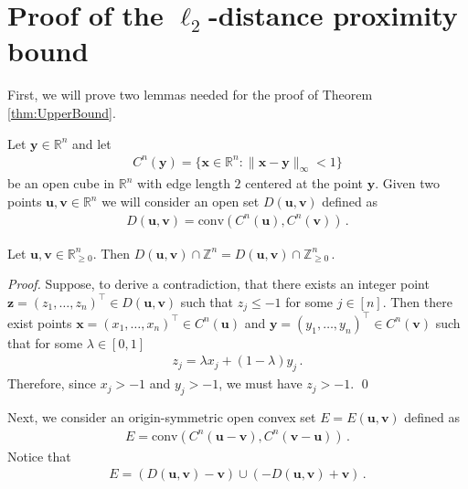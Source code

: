 \documentclass[runningheads]{llncs}
\newcommand{\ve}{\boldsymbol}
\newcommand{\be}{\begin{eqnarray}}
\newcommand{\bea}{\begin{eqnarray*}}
\newcommand{\ee}{\end{eqnarray}}
\newcommand{\eea}{\end{eqnarray*}}
\newcommand{\conv}{\mathrm{conv}}
\newcommand{\R}{\mathbb R}
\newcommand{\Z}{\mathbb Z}
\newcommand{\interior}{\mbox{\rm int}}
\renewcommand\>{\rangle}
\newcommand\<{\langle}
\newcommand\0{\mathbf{0}}
\begin{document}
\section{Proof of the $\ell_2$-distance proximity bound}

First, we will prove two lemmas needed for the proof of Theorem \ref{thm:UpperBound}.

Let ${\ve y} \in\R^n$ and let
\bea
C^n({\ve y})=\{{\ve x}\in  \R^n: \|{\ve x}-{\ve y} \|_{\infty} < 1 \}
\eea
be an open cube in $\R^n$ with edge length $2$ centered at the point ${\ve y}$. 
Given two points ${\ve u}, {\ve v}\in \R^n$ we will
consider an open set $D({\ve u}, {\ve v})$ defined as
%
\bea
D({\ve u}, {\ve v})=\conv(C^n({\ve u}), C^n({\ve v}))\,.
\eea

\begin{lemma}
\label{D_property} Let ${\ve u}, {\ve v}\in\R^n_{\ge 0}$. Then
$D({\ve u}, {\ve v})\cap\Z^n=D({\ve u}, {\ve v})\cap\Z^n_{\ge 0}\,.$
\end{lemma}
\begin{proof}
Suppose, to derive a contradiction, that there exists an integer point ${\ve z}=(z_1,\ldots, z_n)^\top \in D({\ve u}, {\ve v})$ such that $z_j\le -1$ for some $j\in [n]$.
Then there exist points ${\ve x}=(x_1,\ldots, x_n)^\top\in C^n({\ve u})$ and  ${\ve y}=(y_1,\ldots, y_n)^\top\in  C^n({\ve v})$ such that for some $\lambda\in [0,1]$ 
\bea
z_j=\lambda x_j + (1-\lambda) y_j\,.
\eea
Therefore, since $x_j > -1$ and $y_j> -1$, we must have $z_j>-1$. 
\qed\end{proof}

Next, we consider an origin-symmetric open convex set $E=E({\ve u}, {\ve v})$ defined as
\bea
E=\conv(C^n({\ve u}-{\ve v}), C^n({\ve v}-{\ve u}))\,.
\eea
Notice that
\be\label{zonotope_union}
E= (D({\ve u}, {\ve v})-{\ve v})\cup(-D({\ve u}, {\ve v})+{\ve v})\,.
\ee
\end{document}

